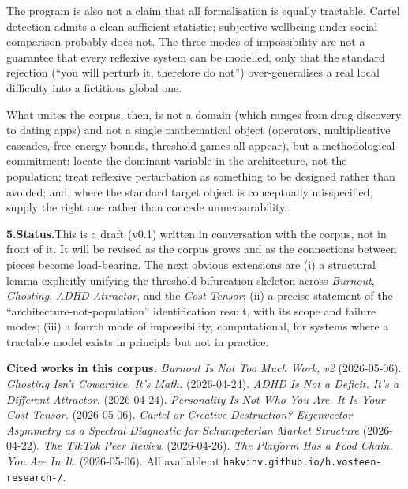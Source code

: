 \documentclass[11pt]{article}
\begin{document}
\medskip\noindent The program is also not a claim that all formalisation is
equally tractable. Cartel detection admits a clean sufficient statistic;
subjective wellbeing under social comparison probably does not. The three
modes of impossibility are not a guarantee that every reflexive system can
be modelled, only that the standard rejection (``you will perturb it,
therefore do not'') over-generalises a real local difficulty into a
fictitious global one.

\medskip\noindent What unites the corpus, then, is not a domain (which
ranges from drug discovery to dating apps) and not a single mathematical
object (operators, multiplicative cascades, free-energy bounds, threshold
games all appear), but a methodological commitment: locate the dominant
variable in the architecture, not the population; treat reflexive
perturbation as something to be designed rather than avoided; and, where
the standard target object is conceptually misspecified, supply the right
one rather than concede unmeasurability.

\bigskip\noindent\textbf{5.\quad Status.}\quad This is a draft (v0.1)
written in conversation with the corpus, not in front of it. It will be
revised as the corpus grows and as the connections between pieces become
load-bearing. The next obvious extensions are (i) a structural lemma
explicitly unifying the threshold-bifurcation skeleton across
\textit{Burnout}, \textit{Ghosting}, \textit{ADHD Attractor}, and the
\textit{Cost Tensor}; (ii) a precise statement of the
``architecture-not-population'' identification result, with its scope and
failure modes; (iii) a fourth mode of impossibility, computational, for
systems where a tractable model exists in principle but not in practice.

\bigskip\noindent\textbf{Cited works in this corpus.}\quad
\textit{Burnout Is Not Too Much Work, v2} (2026-05-06).\quad
\textit{Ghosting Isn't Cowardice. It's Math.} (2026-04-24).\quad
\textit{ADHD Is Not a Deficit. It's a Different Attractor.} (2026-04-24).\quad
\textit{Personality Is Not Who You Are. It Is Your Cost Tensor.}
(2026-05-06).\quad
\textit{Cartel or Creative Destruction? Eigenvector Asymmetry as a Spectral
Diagnostic for Schumpeterian Market Structure} (2026-04-22).\quad
\textit{The TikTok Peer Review} (2026-04-26).\quad
\textit{The Platform Has a Food Chain. You Are In It.} (2026-05-06).\quad
All available at \texttt{hakvinv.github.io/h.vosteen-research-/}.
\end{document}
